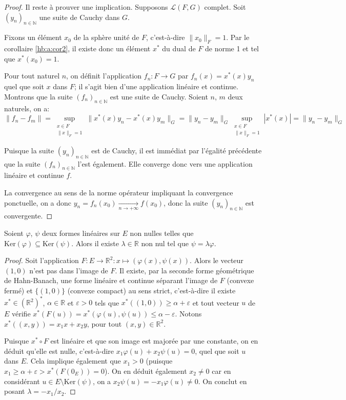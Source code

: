 \begin{proof}
  Il reste à prouver une implication. Supposons $\mathscr{L}(F, G)$ complet.
  Soit $(y_n)_{n\in\mathbb{N}}$ une suite de Cauchy dans $G$.

  Fixons un élément $x_0$ de la sphère unité de $F$, c'est-à-dire
  $\|x_0\|_F = 1$. Par le corollaire \ref{hb:a:cor2}, il existe
  donc un élément $x^*$ du dual de $F$ de norme 1 et tel que $x^*(x_0) = 1$.

  Pour tout naturel $n$, on définit l'application $f_n: F\to G$
  par $f_n(x) = x^*(x)y_n$ quel que soit $x$ dans $F$;
  il s'agit bien d'une application linéaire
  et continue. Montrons que la suite $(f_n)_{n\in\mathbb{N}}$ est une suite
  de Cauchy. Soient $n$, $m$ deux naturels, on a:
  $$\|f_n-f_m\| =
  \sup_{\substack{x\in F\\\|x\|_F = 1}}\|x^*(x)y_n - x^*(x)y_m\|_G =
  \|y_n - y_m\|_G \sup_{\substack{x\in F\\\|x\|_F = 1}} |x^*(x)| =
  \|y_n - y_m\|_G $$

  Puisque la suite $(y_n)_{n\in\mathbb{N}}$ est de Cauchy, il est immédiat
  par l'égalité précédente que la suite $(f_n)_{n\in\mathbb{N}}$ l'est
  également. Elle converge donc vers une application linéaire et continue
  $f$.

  La convergence au sens de la norme opérateur impliquant la
  convergence ponctuelle, on a donc
  $y_n = f_n(x_0)\xrightarrow[n\to+\infty]{} f(x_0)$, donc
  la suite $(y_n)_{n\in\mathbb{N}}$ est convergente.

\end{proof}

\begin{prop}\label{ker:sub:mult}
  Soient $\varphi$, $\psi$ deux formes linéaires sur $E$ non nulles telles
  que $\mathrm{Ker}(\varphi) \subseteq \mathrm{Ker}(\psi)$. Alors
  il existe $\lambda \in\mathbb{R}$ non nul tel que $\psi = \lambda \varphi$.
\end{prop}

\begin{proof}
  Soit l'application $F: E \to \mathbb{R}^2: x\mapsto (\varphi(x), \psi(x))$.
  Alors le vecteur $(1, 0)$ n'est pas dans l'image de $F$. Il existe,
  par la seconde forme géométrique de Hahn-Banach, une forme linéaire
  et continue séparant l'image de $F$ (convexe fermé) et $\{(1, 0)\}$ (convexe
  compact) au sens strict, c'est-à-dire il existe $x^*\in (\mathbb{R}^2)^*$,
  $\alpha\in\mathbb{R}$ et $\varepsilon > 0$ tels que $x^*((1, 0))\geq
  \alpha +\varepsilon$ et tout vecteur $u$ de $E$ vérifie
  $x^*(F(u)) = x^*(\varphi(u), \psi(u))\leq \alpha-\varepsilon$.
  Notons
  $x^*((x, y)) = x_1 x + x_2 y$, pour tout $(x, y)\in\mathbb{R}^2$.

  Puisque $x^*\circ F$ est linéaire et que son image est majorée par une
  constante, on en déduit qu'elle est nulle, c'est-à-dire $x_1 \varphi(u) +
  x_2 \psi(u) = 0$, quel que soit $u$ dans $E$.
  Cela implique également que $x_1 > 0$ (puisque $x_1 \geq
  \alpha + \varepsilon > x^*(F(0_E)) = 0$).
  On en déduit également $x_2\neq 0$ car en considérant $u\in E\setminus
  \mathrm{Ker}(\psi)$, on a $x_2 \psi(u) = -x_1\varphi(u) \neq 0 $.
On conclut en posant $\lambda = -x_1/x_2$.
\end{proof}

